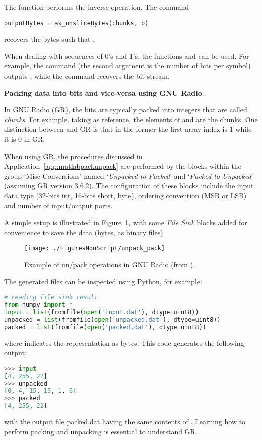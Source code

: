 The function  performs the inverse operation.
The command
\begin{lstlisting}
outputBytes = ak_unsliceBytes(chunks, b)
\end{lstlisting}
recovers the bytes such that .

When dealing with sequences of 0's and 1's, the functions  and  can be used. For example, the command  (the second argument is the number of bits per symbol) outputs \co{[1 7]}, while the command  recovers the bit stream.
\eApplication 

\bApplication \textbf{Packing data into bits and vice-versa using GNU Radio}.
\label{app:grpackunpack}

In GNU Radio (GR), the bits are typically packed into integers that are called \emph{chunks}. For example, taking  as reference,
the elements of  and  are the chunks.
One distinction between {\matlab} and GR is that in the former the first array index
is 1 while it is 0 in GR.

When using GR, the procedures discussed in Application~\ref{app:matlabpackunpack} 
are performed by the blocks within the group `Misc Conversions' named `\emph{Unpacked to Packed}' and `\emph{Packed to Unpacked}' (assuming GR version 3.6.2). 
The configuration of these blocks include the input data type (32-bits int, 16-bits short, byte), ordering convention (MSB or LSB) and number of input/output ports.

A simple setup is illustrated in Figure~\ref{fig:unpack_pack_setup}, with some \emph{File Sink} blocks added for convenience to save the data (bytes, as binary files).

\begin{figure}[htbp]
\centering
\texttt{[image: ./FiguresNonScript/unpack\_pack]}
\caption{Example of un/pack operations in GNU Radio (from ).\label{fig:unpack_pack_setup}}
\end{figure}

The generated files can be inspected using Python, for example:
\begin{lstlisting}[language=Python]
# reading file sink result
from numpy import *
input = list(fromfile(open('input.dat'), dtype=uint8))
unpacked = list(fromfile(open('unpacked.dat'), dtype=uint8))
packed = list(fromfile(open('packed.dat'), dtype=uint8))
\end{lstlisting}
where  indicates the representation as bytes. This code generates the following output:
\begin{lstlisting}[language=Python]
>>> input
[4, 255, 22]
>>> unpacked
[0, 4, 15, 15, 1, 6]
>>> packed
[4, 255, 22]
\end{lstlisting}
with the output file {packed.dat} having the same contents of .
Learning how to perform packing and unpacking is essential to understand GR.
\eApplication

